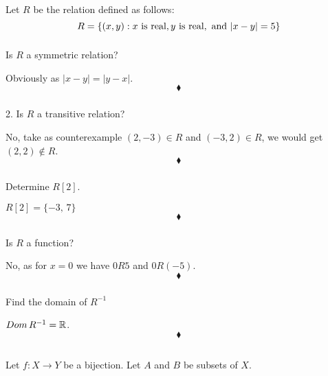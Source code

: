 \renewcommand{\thesubsection}{\thesection.\RomanNumeralCaps{4}}
\subsection{}
Let $R$ be the relation defined as follows: 
$$R = \{(x, y):x \text{ is real}, y \text{ is real}, \text{ and } |x - y| =5\} $$

\subsubsection{}
\begin{tcolorbox}
Is $R$ a symmetric relation? 
\end{tcolorbox}
 Obviously as $|x-y|=|y-x|$.
$$\blacklozenge$$
\subsubsection{}
\begin{tcolorbox}

2. Is $R$ a transitive relation? 
\end{tcolorbox}
 No, take as counterexample $(2,-3)\in R$ and $(-3,2)\in R$, we would get $(2,2)\not\in R$.
$$\blacklozenge$$
\subsubsection{}
\begin{tcolorbox}
Determine $R[2]$. 
\end{tcolorbox}
 $R[2]=\{-3,\, 7\}$
$$\blacklozenge$$
\subsubsection{}
\begin{tcolorbox}
Is $R$ a function? 
\end{tcolorbox}

 No, as for $x=0$ we have $0R5$ and $0R(-5)$.
$$\blacklozenge$$
\subsubsection{}
\begin{tcolorbox}
Find the domain of $R^{-1}$
\end{tcolorbox}
$Dom\, R^{-1}= \mathbb{R}$. 
$$\blacklozenge$$
\newpage

\renewcommand{\thesubsection}{\thesection.\RomanNumeralCaps{5}}
\subsection{}
Let $f: X\rightarrow Y$ be a bijection. Let $A$ and $B$ be subsets of $X$.

